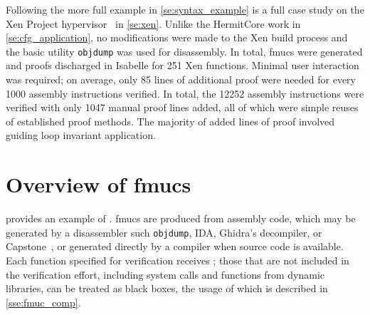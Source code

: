 Following the more full example in \cref{se:syntax_example} is a full case study
on the Xen Project hypervisor~\citep{chisnall2008definitive} in \cref{se:xen}.%
Unlike the HermitCore work in \cref{se:cfg_application},%
no modifications were made to the Xen build process
and the basic utility \texttt{objdump} was used for disassembly.
In total, \acp{fmuc} were generated and proofs discharged in Isabelle
for 251 Xen functions.
Minimal user interaction was required;
on average, only \num{85} lines of additional proof were needed
for every \num{1000} assembly instructions verified.
In total, the \num{12252} assembly instructions
were verified with only \num{1047} manual proof lines added,
all of which were simple reuses of established proof methods.
The majority of added lines of proof involved guiding loop invariant application.%

\section{Overview of \acsp*{fmuc}}\label{se:fmuc_ex}
 provides an example of .
\Acp{fmuc} are produced from assembly code,
which may be generated by a disassembler such \texttt{objdump},
IDA,
Ghidra's decompiler, or Capstone~\citep{capstone},
or generated directly by a compiler when source code is available.
Each function specified for verification receives ;
those that are not included in the verification effort,
including system calls and functions from dynamic libraries,
can be treated as black boxes,
the usage of which is described in \cref{sse:fmuc_comp}.

